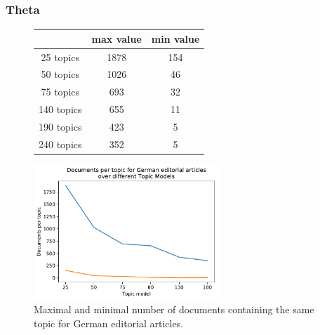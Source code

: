\subsubsection{Theta}
\begin{figure}
	\begin{minipage}[t]{0.5\textwidth}
		\centering
		\begin{tabular}{c|cc}
			&max value & min value\\
			\hline
			25 topics&1878&154\\
			50 topics&1026&46\\
			75 topics&693&32\\
			140 topics&655&11\\
			190 topics &423&5\\
			240 topics&	352&5\\
		\end{tabular}
	\end{minipage}
	\begin{minipage}{0.5\textwidth}
	\centering
	\includegraphics[width=7cm]{gfx/Eval_IC/German_Editorial_Doc_per_topic.pdf}
	\end{minipage}
\caption[]{Maximal and minimal number of documents containing the same topic for German editorial articles.}
\label{eval:amount doc_per_topic_ger}
\end{figure}

